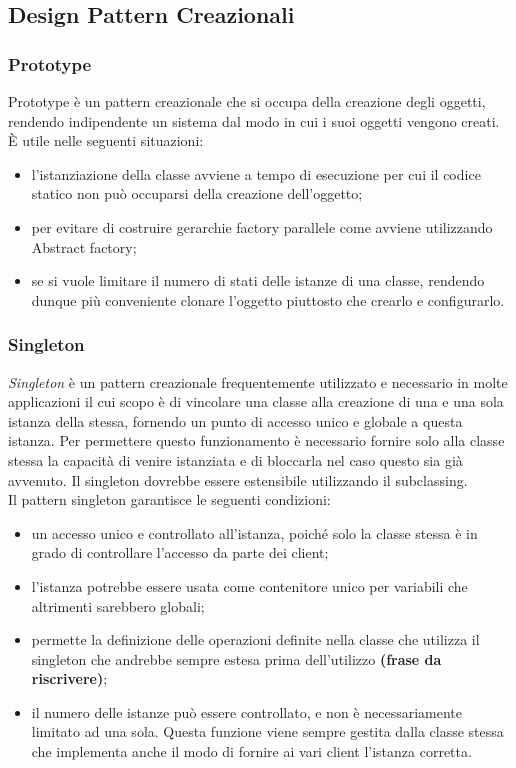 \subsection{Design Pattern Creazionali}

\subsubsection{Prototype}
Prototype è un pattern creazionale che si occupa della creazione degli oggetti, rendendo indipendente un sistema dal modo in cui i suoi oggetti vengono creati.
È utile nelle seguenti situazioni:
\begin{itemize}
	\item l'istanziazione della classe avviene a tempo di esecuzione per cui il codice statico non può occuparsi della creazione dell'oggetto;
	\item per evitare di costruire gerarchie factory parallele come avviene utilizzando Abstract factory;
	\item se si vuole limitare il numero di stati delle istanze di una classe, rendendo dunque più conveniente clonare l'oggetto piuttosto che crearlo e configurarlo.
\end{itemize}

\subsubsection{Singleton}
\textit{Singleton} è un pattern creazionale frequentemente utilizzato e necessario in molte applicazioni il cui scopo è di vincolare una classe alla creazione di una e una sola istanza della stessa, fornendo un punto di accesso unico e globale a questa istanza. Per permettere questo funzionamento è necessario fornire solo alla classe stessa la capacità di venire istanziata e di bloccarla nel caso questo sia già avvenuto. Il singleton dovrebbe essere estensibile utilizzando il subclassing.\\
Il pattern singleton garantisce le seguenti condizioni:
\begin{itemize}
	\item un accesso unico e controllato all'istanza, poiché solo la classe stessa è in grado di controllare l'accesso da parte dei client;
	\item l'istanza potrebbe essere usata come contenitore unico per variabili che altrimenti sarebbero globali;
	\item permette la definizione delle operazioni definite nella classe che utilizza il singleton che andrebbe sempre estesa prima dell'utilizzo \textbf{(frase da riscrivere)};
	\item il numero delle istanze può essere controllato, e non è necessariamente limitato ad una sola. Questa funzione viene sempre gestita dalla classe stessa che implementa anche il modo di fornire ai vari client l'istanza corretta.
\end{itemize}


